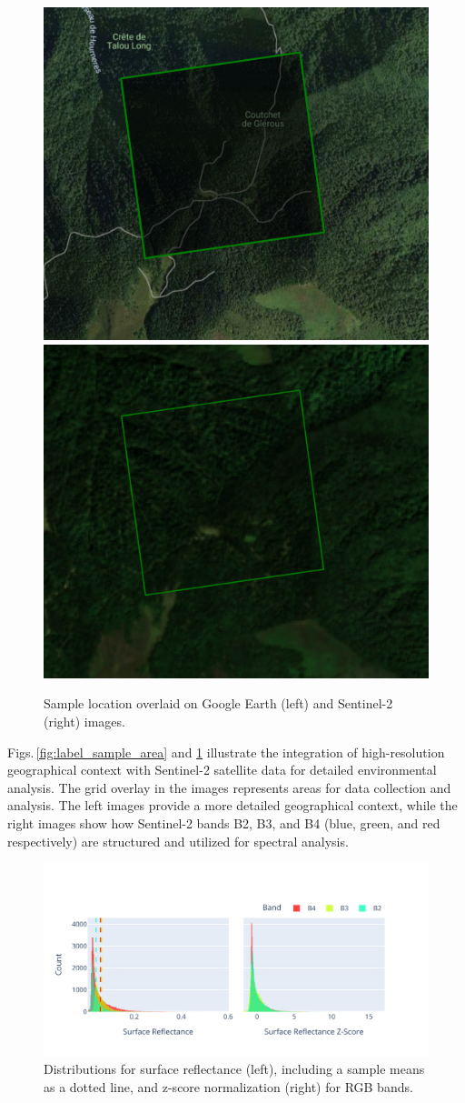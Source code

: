 \begin{figure}[!thb]
    \centering

    \includegraphics[width=0.48\linewidth]{figures/figures_sentinel/sample_earth.png}
    \includegraphics[width=0.48\linewidth]{figures/figures_sentinel/sample_sentinel.png}

    \caption{Sample location overlaid on Google Earth (left) and Sentinel-2 (right) images.}
    \label{fig:label_sample}
\end{figure}

Figs.\,\ref{fig:label_sample_area} and \ref{fig:label_sample} illustrate the integration of high-resolution geographical context with Sentinel-2 satellite data for detailed environmental analysis. The grid overlay in the images represents areas for data collection and analysis. The left images provide a more detailed geographical context, while the right images show how Sentinel-2 bands B2, B3, and B4 (blue, green, and red respectively) are structured and utilized for spectral analysis.


\begin{figure}[ht]
    \centering
    \includegraphics[width=0.98\linewidth, trim={15pt 25pt 10pt 50pt}, clip]{figures/figures_features/bgr_hist.pdf}
    \caption{Distributions for surface reflectance (left), including a sample means as a dotted line, and z-score normalization (right) for RGB bands.}
    \label{fig:bgr_hist}
\end{figure}

